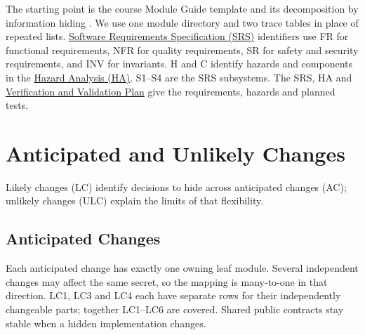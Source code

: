 \documentclass[12pt, titlepage]{article}
\newcommand{\repo}{https://github.com/richy1337/Verity}
\newcommand{\pdfbase}{\repo/blob/main/pdfs}
\begin{document}
The starting point is the course Module Guide template and its decomposition by information hiding \citep{ParnasEtAl1984}. We use one module directory and two trace tables in place of repeated lists. \href{\pdfbase/SRS/SRS.pdf}{Software Requirements Specification (SRS)} identifiers use FR for functional requirements, NFR for quality requirements, SR for safety and security requirements, and INV for invariants. H and C identify hazards and components in the \href{\pdfbase/HazardAnalysis/HazardAnalysis.pdf}{Hazard Analysis (HA)}. S1--S4 are the SRS subsystems. The SRS, HA and \href{\pdfbase/VnVPlan/VnVPlan.pdf}{Verification and Validation Plan} give the requirements, hazards and planned tests.

\section{Anticipated and Unlikely Changes} \label{SecChange}

Likely changes (LC) identify decisions to hide across anticipated changes (AC); unlikely changes (ULC) explain the limits of that flexibility.

\subsection{Anticipated Changes} \label{SecAchange}

Each anticipated change has exactly one owning leaf module. Several independent changes may affect the same secret, so the mapping is many-to-one in that direction. LC1, LC3 and LC4 each have separate rows for their independently changeable parts; together LC1--LC6 are covered. Shared public contracts stay stable when a hidden implementation changes.
\end{document}
